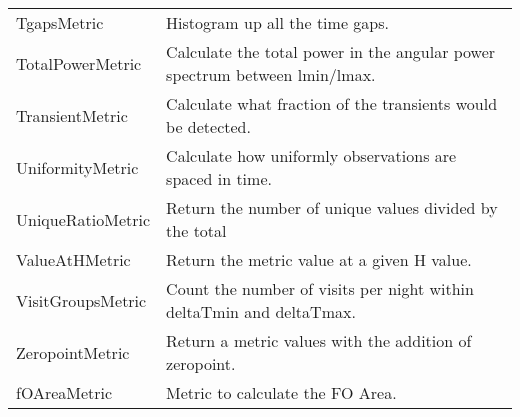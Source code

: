 \begin{table}
\begin{tabular}{ll}
 TgapsMetric &  Histogram up all the time gaps. \\
 TotalPowerMetric &  Calculate the total power in the angular power spectrum between lmin/lmax. \\
 TransientMetric &  Calculate what fraction of the transients would be detected. \\
 UniformityMetric &  Calculate how uniformly observations are spaced in time. \\
 UniqueRatioMetric &  Return the number of unique values divided by the total \\
 ValueAtHMetric &  Return the metric value at a given H value. \\
 VisitGroupsMetric &  Count the number of visits per night within deltaTmin and deltaTmax. \\
 ZeropointMetric &  Return a metric values with the addition of zeropoint. \\
 fOAreaMetric &  Metric to calculate the FO Area. \\
\hline
\end{tabular}

\end{table}

